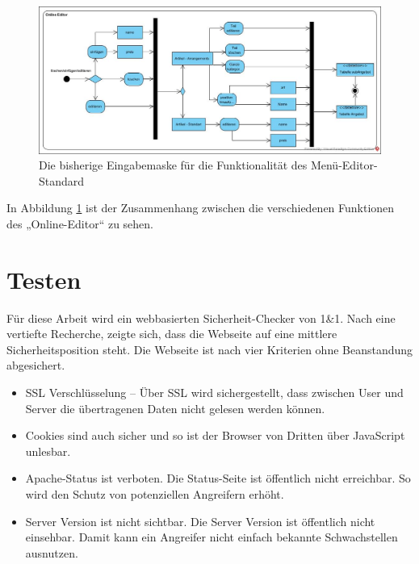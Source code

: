 \begin{figure}[h]
	\centering
	\includegraphics[width=1\linewidth]{Graphics/OnlineEdior.jpg}
	\caption[Kundeansicht]{Die bisherige Eingabemaske für die Funktionalität des Menü-Editor-Standard}
	\label{fig: Editor-Menü-Funktionalität}
\end{figure}
In Abbildung \ref{fig: Editor-Menü-Funktionalität} ist der Zusammenhang zwischen die verschiedenen Funktionen des „Online-Editor“ zu sehen.


\section{Testen} 


Für diese Arbeit wird ein webbasierten Sicherheit-Checker von 1\&1. Nach eine vertiefte Recherche, zeigte sich, dass die Webseite auf eine mittlere Sicherheitsposition steht. Die Webseite ist nach vier Kriterien ohne Beanstandung abgesichert.

\begin{itemize}	
	
\item\ac{SSL} Verschlüsselung – Über SSL wird sichergestellt, dass zwischen User und Server die übertragenen Daten nicht gelesen werden können.

\item Cookies sind auch sicher und so ist der Browser von Dritten über JavaScript unlesbar.

\item Apache-Status ist verboten. Die Status-Seite ist öffentlich nicht erreichbar. So wird den Schutz von potenziellen Angreifern erhöht. 

\item Server Version ist nicht sichtbar. Die Server Version ist öffentlich nicht einsehbar. Damit kann ein Angreifer nicht einfach bekannte Schwachstellen ausnutzen.
\end{itemize}


